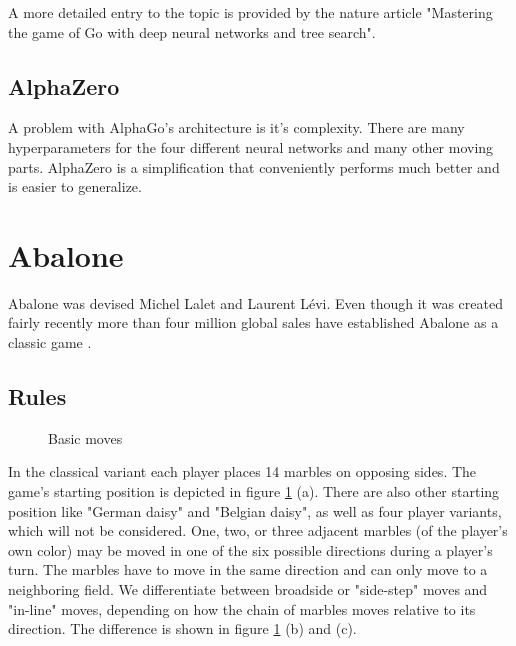 A more detailed entry to the topic is provided by the nature article "Mastering the game of Go with deep neural networks and tree search". \cite{silver_mastering_2016}

\subsection{AlphaZero}
A problem with AlphaGo's architecture is it's complexity. There are many hyperparameters for the four different neural networks and many other moving parts. AlphaZero is a simplification that conveniently performs much better and is easier to generalize.

\section{Abalone}
Abalone was devised Michel Lalet and Laurent Lévi. Even though it was created fairly recently more than four million global sales have established Abalone as a classic game \cite{noauthor_abalone_2020}.

\subsection{Rules}

\begin{figure}[!h]
    \centering
    \hfill
    \hfill
    \caption{Basic moves \cite{abalone_sa_abalone_nodate}}
    \label{basics}
\end{figure}

In the classical variant each player places 14 marbles on opposing sides. The game's starting position is depicted in figure \ref{basics} (a). There are also other starting position like "German daisy" and "Belgian daisy", as well as four player variants, which will not be considered. One, two, or three adjacent marbles (of the player's own color) may be moved in one of the six possible directions during a player's turn. The marbles have to move in the same direction and can only move to a neighboring field. We differentiate between broadside or "side-step" moves and "in-line" moves, depending on how the chain of marbles moves relative to its direction. The difference is shown in figure \ref{basics} (b) and (c).

